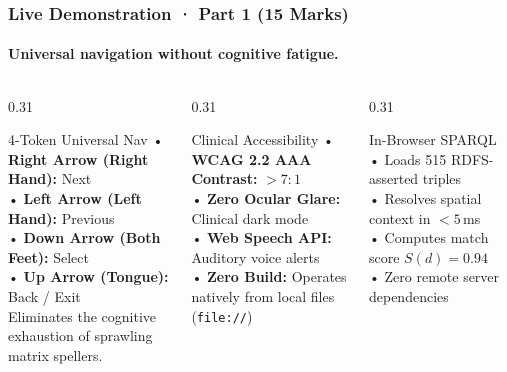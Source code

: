 \documentclass[aspectratio=169,10pt]{beamer}
\begin{document}
\begin{frame}
    \frametitle{Live Demonstration · Part 1 (15 Marks)}
    \framesubtitle{Universal navigation without cognitive fatigue.}
    \begin{columns}[T]
        \begin{column}{0.31\textwidth}
            \begin{block}{\small 4-Token Universal Nav}
                \scriptsize
                • \textbf{Right Arrow (Right Hand):} Next\\
                • \textbf{Left Arrow (Left Hand):} Previous\\
                • \textbf{Down Arrow (Both Feet):} Select\\
                • \textbf{Up Arrow (Tongue):} Back / Exit\\[0.1cm]
                Eliminates the cognitive exhaustion of sprawling matrix spellers.
            \end{block}
        \end{column}
        \begin{column}{0.31\textwidth}
            \begin{block}{\small Clinical Accessibility}
                \scriptsize
                • \textbf{WCAG 2.2 AAA Contrast:} $> 7:1$\\
                • \textbf{Zero Ocular Glare:} Clinical dark mode\\
                • \textbf{Web Speech API:} Auditory voice alerts\\
                • \textbf{Zero Build:} Operates natively from local files (\texttt{file://})
            \end{block}
        \end{column}
        \begin{column}{0.31\textwidth}
            \begin{block}{\small In-Browser SPARQL}
                \scriptsize
                • Loads 515 RDFS-asserted triples\\
                • Resolves spatial context in $< 5$\,ms\\
                • Computes match score $S(d) = 0.94$\\
                • Zero remote server dependencies
            \end{block}
        \end{column}
    \end{columns}
\end{frame}
\end{document}
